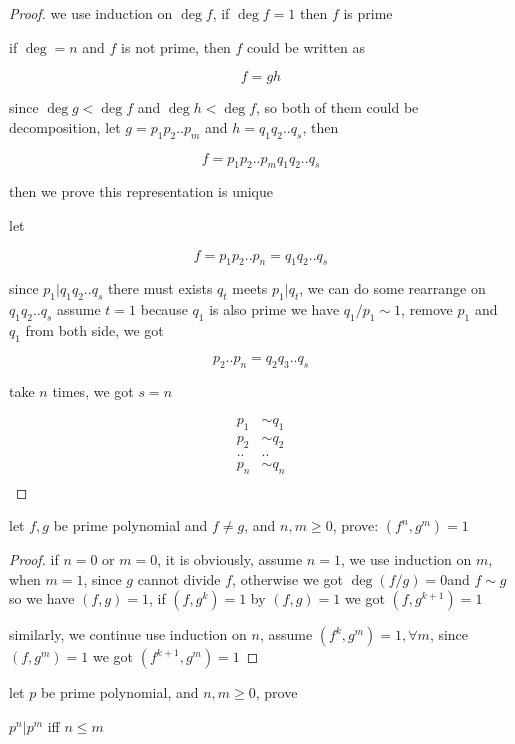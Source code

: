 \begin{proof}
    we use induction on $\deg f$, if $\deg f = 1$ then $f$ is prime 

    if $\deg = n$ and $f$ is not prime, then $f$ could be written as

    \[
        f = gh
    \]

    since $\deg g < \deg f$ and $\deg h < \deg f$, so both of them could be decomposition,
    let $g = p_1p_2..p_m$ and $h = q_1q_2..q_s$, then

    \[
        f = p_1p_2..p_mq_1q_2..q_s
    \]

    then we prove this representation is unique

    let

    \[
        f = p_1p_2..p_n = q_1q_2..q_s
    \]

    since $p_1 | q_1q_2..q_s$ there must exists $q_t$ meets $p_1 | q_t$, we can do some rearrange on $q_1q_2..q_s$ assume $t=1$ because $q_1$
    is also prime we have $q_1/p_1 \sim 1$, remove $p_1$ and $q_1$ from both side, we got

    \[
        p_2..p_n = q_2q_3..q_s
    \]

    take $n$ times, we got $s=n$

    \begin{align*}
        p_1 &\sim q_1 \\
        p_2 &\sim q_2 \\
        .. & .. \\
        p_n &\sim q_n \\
    \end{align*}
\end{proof}

\begin{exercise}
    let $f,g$ be prime polynomial and $f \ne g$, and $n,m \ge 0$, prove: $(f^n, g^m) = 1$
\end{exercise}

\begin{proof}
   if $n = 0$ or $m = 0$, it is obviously, assume $n=1$, we use induction on $m$,
   when $m=1$, since $g$ cannot divide $f$, otherwise we got $\deg (f/g) = 0$and $f \sim g$
   so we have $(f,g) = 1$, if $(f,g^k) = 1$ by $(f,g) = 1$ we got $(f,g^{k+1}) = 1$

   similarly, we continue use induction on $n$,
   assume $(f^k, g^m) = 1,\forall m$, since $(f,g^m) = 1$ we got $(f^{k+1}, g^{m}) = 1$
\end{proof}

\begin{exercise}
    let $p$ be prime polynomial, and $n,m \ge 0$, prove

    $p^n | p^m$ iff $n \le m$
\end{exercise}


